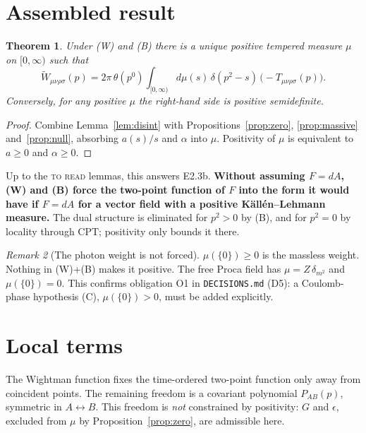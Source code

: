 \documentclass[11pt]{article}
\newtheorem{theorem}{Theorem}
\theoremstyle{remark}
\newtheorem{remark}[theorem]{Remark}
\newcommand{\Wt}{\widetilde W}
\newcommand{\Tt}{T}
\begin{document}
\section{Assembled result}

\begin{theorem}\label{thm:E2b}
Under (W) and (B) there is a unique positive tempered measure $\mu$ on
$[0,\infty)$ such that
\begin{equation}
\Wt_{\mu\nu\rho\sigma}(p)=2\pi\,\theta(p^0)\int_{[0,\infty)}d\mu(s)\,
\delta(p^2-s)\,\bigl(-\Tt_{\mu\nu\rho\sigma}(p)\bigr).
\label{eq:KL}
\end{equation}
Conversely, for any positive $\mu$ the right-hand side is positive
semidefinite.
\end{theorem}
\begin{proof}
Combine Lemma~\ref{lem:disint} with Propositions~\ref{prop:zero},
\ref{prop:massive} and~\ref{prop:null}, absorbing $a(s)/s$ and $\alpha$ into
$\mu$. Positivity of $\mu$ is equivalent to $a\ge0$ and $\alpha\ge0$.
\end{proof}

Up to the \textsc{to read} lemmas, this answers E2.3b. \textbf{Without assuming
$F=dA$, (W) and (B) force the two-point function of $F$ into the form it would
have if $F=dA$ for a vector field with a positive K\"all\'en--Lehmann
measure.} The dual structure is eliminated for $p^2>0$ by (B), and for
$p^2=0$ by locality through CPT; positivity only bounds it there.

\begin{remark}[The photon weight is not forced]\label{rem:coulomb}
$\mu(\{0\})\ge0$ is the massless weight. Nothing in (W)+(B) makes it positive.
The free Proca field has $\mu=Z\,\delta_{m^2}$ and $\mu(\{0\})=0$. This
confirms obligation O1 in \texttt{DECISIONS.md} (D5): a Coulomb-phase
hypothesis (C), $\mu(\{0\})>0$, must be added explicitly.
\end{remark}

\section{Local terms}\label{sec:local}

The Wightman function fixes the time-ordered two-point function only away
from coincident points. The remaining freedom is a covariant polynomial
$P_{AB}(p)$, symmetric in $A\leftrightarrow B$. This freedom is \emph{not}
constrained by positivity: $G$ and $\epsilon$, excluded from $\mu$ by
Proposition~\ref{prop:zero}, are admissible here.
\end{document}
